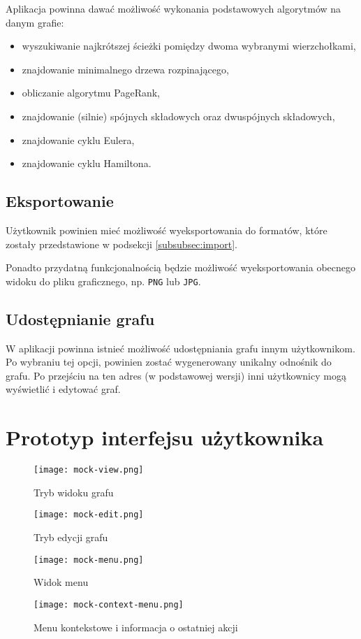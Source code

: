 Aplikacja powinna dawać możliwość wykonania podstawowych algorytmów na danym grafie:

\begin{itemize}
\setlength\itemsep{0em}
\item wyszukiwanie najkrótszej ścieżki pomiędzy dwoma wybranymi wierzchołkami,
\item znajdowanie minimalnego drzewa rozpinającego,
\item obliczanie algorytmu PageRank,
\item znajdowanie (silnie) spójnych składowych oraz dwuspójnych składowych,
\item znajdowanie cyklu Eulera,
\item znajdowanie cyklu Hamiltona.
\end{itemize}

\subsection{Eksportowanie}
Użytkownik powinien mieć możliwość wyeksportowania do formatów, które zostały przedstawione w podsekcji \ref{subsubsec:import}. 

Ponadto przydatną funkcjonalnością będzie możliwość wyeksportowania obecnego widoku do pliku graficznego, np. \texttt{PNG} lub \texttt{JPG}. 

\subsection{Udostępnianie grafu}
W aplikacji powinna istnieć możliwość udostępniania grafu innym użytkownikom. Po wybraniu tej opcji, powinien zostać wygenerowany unikalny odnośnik do grafu. Po przejściu na ten adres (w podstawowej wersji) inni użytkownicy mogą wyświetlić i edytować graf.



\section{Prototyp interfejsu użytkownika}

\begin{figure}[H]
\centering
\texttt{[image: mock-view.png]}
\caption{Tryb widoku grafu}
\end{figure}

\begin{figure}[H]
\centering
\texttt{[image: mock-edit.png]}
\caption{Tryb edycji grafu}
\end{figure}

\begin{figure}[H]
\centering
\texttt{[image: mock-menu.png]}
\caption{Widok menu}
\end{figure}

\begin{figure}[H]
\centering
\texttt{[image: mock-context-menu.png]}
\caption{Menu kontekstowe i informacja o ostatniej akcji}
\end{figure}